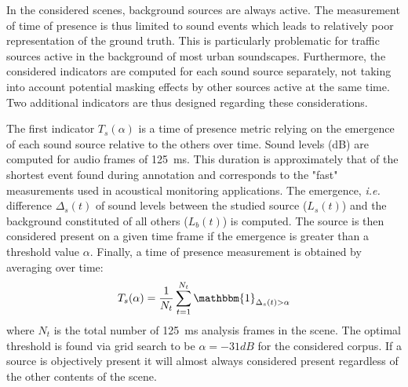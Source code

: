 \documentclass{article}
\begin{document}
\begin{sloppy}
In the considered scenes, background sources are always active. The measurement of time of presence is thus limited to sound events which leads to relatively poor representation of the ground truth. This is particularly problematic for traffic sources active in the background of most urban soundscapes. Furthermore, the considered indicators are computed for each sound source separately, not taking into account potential masking effects by other sources active at the same time. Two additional indicators are thus designed regarding these considerations.

The first indicator $T_s(\alpha)$ is a time of presence metric relying on the emergence of each sound source relative to the others over time. Sound levels (dB) are computed for audio frames of 125~ms. This duration is approximately that of the shortest event found during annotation and corresponds to the "fast" measurements used in acoustical monitoring applications. The emergence, \textit{i.e.} difference $\Delta_s(t)$ of sound levels between the studied source ($L_s(t)$) and the background constituted of all others ($L_b(t)$) is computed. The source is then considered present on a given time frame if the emergence is greater than a threshold value $\alpha$. Finally, a time of presence measurement is obtained by averaging over time:
\begin{equation}
T_s(\alpha) = \frac{1}{N_t}\sum_{t = 1}^{N_t}\mathbbm{1}_{\Delta_s(t)>\alpha}
\end{equation}
where $N_t$ is the total number of 125~ms analysis frames in the scene. The optimal threshold is found via grid search to be $\alpha = -31dB$ for the considered corpus. If a source is objectively present it will almost always considered present regardless of the other contents of the scene.


\end{sloppy}
\end{document}

